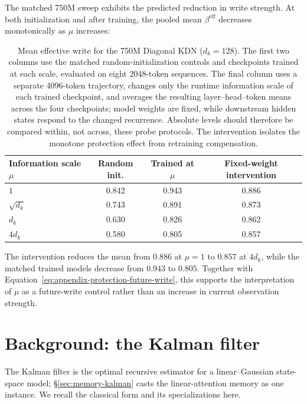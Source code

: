 \documentclass[11pt,letterpaper,logo]{yalearxiv}
\begin{document}
The matched 750M sweep exhibits the predicted reduction in write strength. At both initialization
and after training, the pooled mean $\beta^{\mathrm{eff}}$ decreases monotonically as $\mu$
increases:
\begin{table}[H]
  \centering
  \small
  \setlength{\tabcolsep}{8pt}
  \begin{tabular}{@{}lccc@{}}
    \toprule
    Information scale $\mu$ & Random init. & Trained at $\mu$ & Fixed-weight intervention \\
    \midrule
    $1$          & 0.842 & 0.943 & 0.886 \\
    $\sqrt{d_k}$ & 0.743 & 0.891 & 0.873 \\
    $d_k$        & 0.630 & 0.826 & 0.862 \\
    $4d_k$       & 0.580 & 0.805 & 0.857 \\
    \bottomrule
  \end{tabular}
  \caption{Mean effective write for the 750M Diagonal KDN ($d_k=128$). The first two columns use
  the matched random-initialization controls and checkpoints trained at each scale, evaluated on
  eight 2048-token sequences. The final column uses a separate 4096-token trajectory, changes only
  the runtime information scale of each trained checkpoint, and averages the resulting
  layer--head--token means across the four checkpoints; model weights are fixed, while downstream
  hidden states respond to the changed recurrence. Absolute levels should therefore be compared
  within, not across, these probe protocols. The intervention isolates the monotone protection
  effect from retraining compensation.}
  \label{tab:appendix-effective-write-scale}
\end{table}
The intervention reduces the mean from $0.886$ at $\mu=1$ to $0.857$ at $4d_k$, while the
matched trained models decrease from $0.943$ to $0.805$. Together with
Equation~\eqref{eq:appendix-protection-future-write}, this supports the interpretation of $\mu$ as
a future-write control rather than an increase in current observation strength.

\FloatBarrier

\iffalse
\section{Background: the Kalman filter}
\label{app:kalman}

The Kalman filter is the optimal recursive estimator for a linear--Gaussian
state-space model; \S\ref{sec:memory-kalman} casts the linear-attention memory as one
instance. We recall the classical form and its specializations here.
\end{document}
